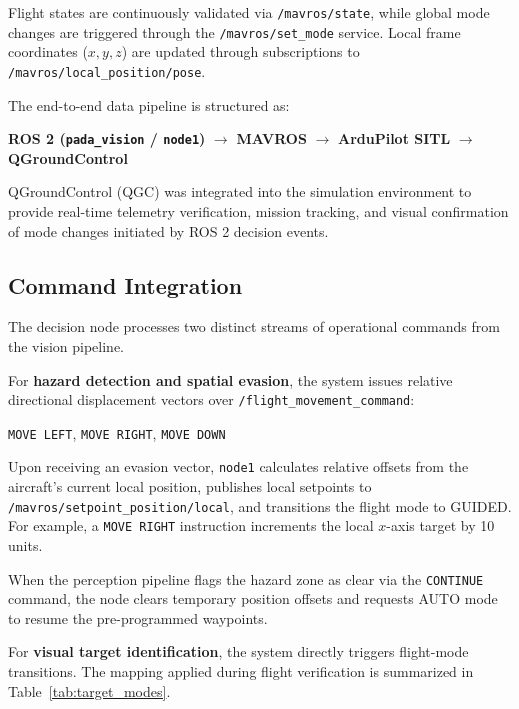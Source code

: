 \documentclass[12pt,a4paper]{article}
\begin{document}
Flight states are continuously validated via \texttt{/mavros/state}, while global mode changes are triggered through the \texttt{/mavros/set\_mode} service. Local frame coordinates ($x, y, z$) are updated through subscriptions to \texttt{/mavros/local\_position/pose}.

The end-to-end data pipeline is structured as:

\begin{center}
\textbf{ROS 2 (\texttt{pada\_vision} / \texttt{node1})}
$\rightarrow$
\textbf{MAVROS}
$\rightarrow$
\textbf{ArduPilot SITL}
$\rightarrow$
\textbf{QGroundControl}
\end{center}

QGroundControl (QGC) was integrated into the simulation environment to provide real-time telemetry verification, mission tracking, and visual confirmation of mode changes initiated by ROS 2 decision events.

\subsection{Command Integration}

The decision node processes two distinct streams of operational commands from the vision pipeline.

For \textbf{hazard detection and spatial evasion}, the system issues relative directional displacement vectors over \texttt{/flight\_movement\_command}:

\begin{center}
\texttt{MOVE LEFT}, \quad
\texttt{MOVE RIGHT}, \quad
\texttt{MOVE DOWN}
\end{center}



Upon receiving an evasion vector, \texttt{node1} calculates relative offsets from the aircraft's current local position, publishes local setpoints to \texttt{/mavros/setpoint\_position/local}, and transitions the flight mode to GUIDED. For example, a \texttt{MOVE RIGHT} instruction increments the local $x$-axis target by 10 units. 

When the perception pipeline flags the hazard zone as clear via the \texttt{CONTINUE} command, the node clears temporary position offsets and requests AUTO mode to resume the pre-programmed waypoints.

For \textbf{visual target identification}, the system directly triggers flight-mode transitions. The mapping applied during flight verification is summarized in Table~\ref{tab:target_modes}.
\end{document}
